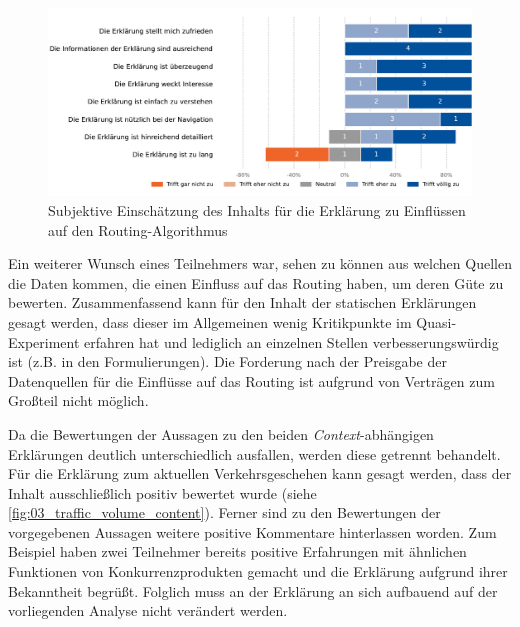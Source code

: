 \begin{figure}[htb!]
    \centering
    \includegraphics[width=\textwidth]{contents/06_model_evaluation/02_evaluation/res/qualitativeFeedback-02_collaborative_algorithm_content.pdf}
    \caption{Subjektive Einschätzung des Inhalts für die Erklärung zu Einflüssen auf den Routing-Algorithmus}
    \label{fig:02_collaborative_algorithm_content}
\end{figure}

Ein weiterer Wunsch eines Teilnehmers war, sehen zu können aus welchen Quellen die Daten kommen, die einen Einfluss auf das Routing haben, um deren Güte zu bewerten. Zusammenfassend kann für den Inhalt der statischen Erklärungen gesagt werden, dass dieser im Allgemeinen wenig Kritikpunkte im Quasi-Experiment erfahren hat und lediglich an einzelnen Stellen verbesserungswürdig ist (z.B. in den Formulierungen). Die Forderung nach der Preisgabe der Datenquellen für die Einflüsse auf das Routing ist aufgrund von Verträgen zum Großteil nicht möglich. 

\bigskip

Da die Bewertungen der Aussagen zu den beiden \textit{Context}-abhängigen Erklärungen deutlich unterschiedlich ausfallen, werden diese getrennt behandelt. Für die Erklärung zum aktuellen Verkehrsgeschehen kann gesagt werden, dass der Inhalt ausschließlich positiv bewertet wurde (siehe \autoref{fig:03_traffic_volume_content}). Ferner sind zu den Bewertungen der vorgegebenen Aussagen weitere positive Kommentare hinterlassen worden. Zum Beispiel haben zwei Teilnehmer bereits positive Erfahrungen mit ähnlichen Funktionen von Konkurrenzprodukten gemacht und die Erklärung aufgrund ihrer Bekanntheit begrüßt. Folglich muss an der Erklärung an sich aufbauend auf der vorliegenden Analyse nicht verändert werden.

